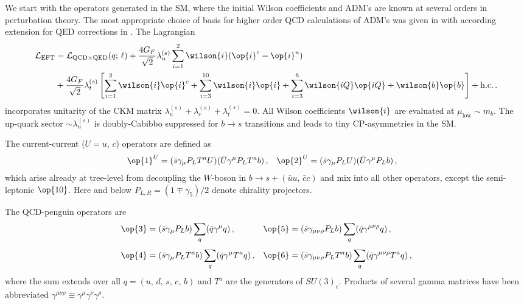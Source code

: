 We start with the operators generated in the SM, where the initial Wilson coefficients
and ADM's are known at several orders in perturbation theory.
The most appropriate choice of basis for higher order QCD calculations of ADM's was
given in \cite{Chetyrkin:1996vx, Chetyrkin:1997gb} with according extension for
QED corrections in \cite{Bobeth:2003at, Huber:2005ig}. The Lagrangian
\begin{equation}
\begin{aligned}
  {\cal L}_\text{EFT} &
  = {\cal L}_{\text{QCD} \times \text{QED}} (q;\, \ell)
  + \frac{4 G_F}{\sqrt{2}} \lambda_{u}^{(s)} \sum_{i=1}^{2} 
     \wilson{i} (\op{i}^c - \op{i}^u)
\\
  & + \frac{4 G_F}{\sqrt{2}} \lambda_{t}^{(s)} \left[
      \sum_{i=1}^{2}  \wilson{i} \op{i}^c
    + \sum_{i=3}^{10} \wilson{i} \op{i}
    + \sum_{i=3}^{6}  \wilson{iQ} \op{iQ}
    + \wilson{b}\op{b} \right] + \mbox{h.c.} \,.
\end{aligned}
\end{equation}
incorporates unitarity of the CKM matrix  $\lambda_u^{(s)} + \lambda_c^{(s)} + 
\lambda_t^{(s)} = 0$. All Wilson coefficients $\wilson{i}$ are evaluated at
$\mu_\text{low} \sim m_b$. The up-quark
sector $\sim \lambda_u^{(s)}$ is doubly-Cabibbo suppressed for $b\to s$
transitions and leads to tiny CP-asymmetries in the SM.

The current-current ($U = u,\, c$) operators are defined as 
\begin{equation}
\begin{aligned}
  \op{1}^U & = (\bar{s} \gamma_\mu P_L T^a U) (\bar{U} \gamma^\mu P_L T^a b) \,, &
  \op{2}^U & = (\bar{s} \gamma_\mu P_L U) (\bar{U} \gamma^\mu P_L b) \,, 
\end{aligned}
\end{equation}
which arise already at tree-level from decoupling the $W$-boson in $b\to s + 
(\bar{u}u,\, \bar{c}c)$ and mix into all other operators, except the
semi-leptonic $\op{10}$. Here and below $P_{L,R} = (1 \mp \gamma_5)/2$ denote
chirality projectors. 

The QCD-penguin operators are
\begin{equation}
\begin{aligned}
  \op{3} & = (\bar{s} \gamma_\mu P_L b)     \sum_q (\bar{q} \gamma^\mu q) \,, &
  \op{5} & = (\bar{s} \gamma_{\mu\nu\rho} P_L b)
             \sum_q (\bar{q} \gamma^{\mu\nu\rho} q) \,,
\\[1mm] 
  \op{4} & = (\bar{s} \gamma_\mu P_L T^a b) \sum_q (\bar{q} \gamma^\mu T^a q) \,, &
  \op{6} & = (\bar{s} \gamma_{\mu\nu\rho} P_L T^a b) 
             \sum_q (\bar{q} \gamma^{\mu\nu\rho} T^a q) \,,
\end{aligned}
\end{equation}
where the sum extends over all $q = (u,\,d,\,s,\,c,\,b)$ and $T^a$ are the
generators of $SU(3)_c$. Products of several gamma matrices have been
abbreviated $\gamma^{\mu\nu\rho} \equiv \gamma^\mu\gamma^\nu \gamma^\rho$. 

